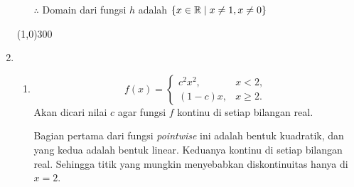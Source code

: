 \begin{enumerate}[leftmargin=*, label={\arabic*}.]
\begin{enumerate}[label={\alph*}.]
    $\therefore$ Domain dari fungsi $h$ adalah 
    $\set*{x \in \mathbb{R} \mid x \neq 1, x\neq 0}$

    \end{enumerate}

\begin{center}\line(1,0){300}\end{center}


\item
    \begin{enumerate}[label={\alph*}.]
    \item \[
    f(x) = 
    \begin{cases}
        c^{2}x^{2}, &{x < 2},\\
        (1-c)x, &{x \geq 2}.
    \end{cases}
    \]
    Akan dicari nilai $c$ agar fungsi $f$ kontinu di setiap bilangan real.

    Bagian pertama dari fungsi \textit{pointwise} ini adalah bentuk kuadratik, 
    dan yang kedua adalah bentuk linear. Keduanya kontinu di setiap bilangan real. 
    Sehingga titik yang mungkin menyebabkan diskontinuitas hanya di $x=2$.


\end{enumerate}
\end{enumerate}
